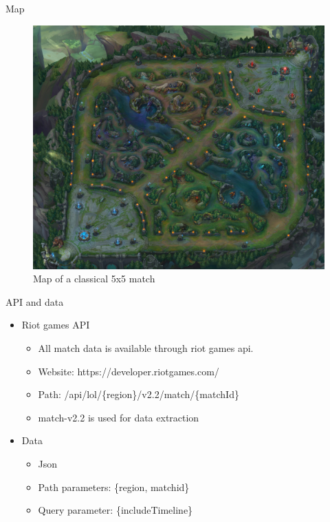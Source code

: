 \begin{frame}{Map}
\begin{figure}[h!]
\centering
\includegraphics[width=\linewidth, height=\textheight]{leagueoflegends/map}
\caption{Map of a classical 5x5 match}
\end{figure}
\end{frame}
\begin{frame}{API and data}
\begin{itemize}
\item Riot games API
\begin{itemize}
\item All match data is available through riot games api. 
\item Website: https://developer.riotgames.com/
\item Path: /api/lol/\{region\}/v2.2/match/\{matchId\}
\item match-v2.2 is used for data extraction 
\end{itemize}
\item Data 
\begin{itemize}
\item Json 
\item Path parameters: \{region, matchid\}
\item Query parameter: \{includeTimeline\} 
\end{itemize}
\end{itemize}
\end{frame}
